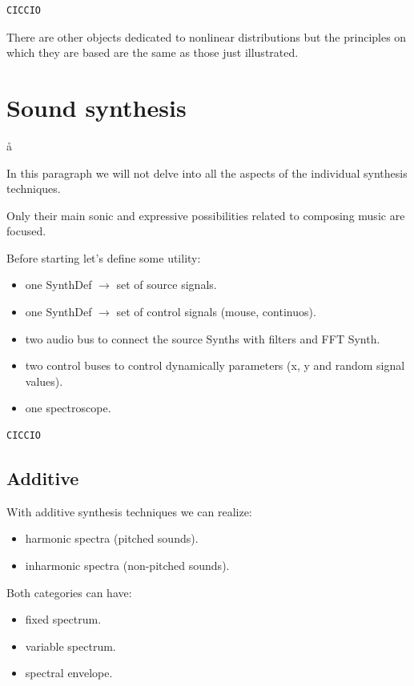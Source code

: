 \begin{lstlisting}[frame=single] 
CICCIO
\end{lstlisting}

There are other objects dedicated to nonlinear distributions but the principles on which they are based are the same as those just illustrated.

\section{Sound synthesis}\label{sound-synthesis}å

In this paragraph we will not delve into all the aspects of the individual synthesis techniques.

Only their main sonic and expressive possibilities related to composing music are focused.

Before starting let's define some utility:

\begin{itemize}
\tightlist
\item one SynthDef \(\rightarrow\) set of source signals. 
\item one SynthDef \(\rightarrow\) set of control signals (mouse, continuos). 
\item two audio bus to connect the source Synths with filters and FFT Synth. 
\item two control buses to control dynamically parameters (x, y and random signal values). 
\item one spectroscope.
\end{itemize}

\begin{lstlisting}[frame=single] 
CICCIO
\end{lstlisting}

\subsection{Additive}\label{additive}

With additive synthesis techniques we can realize: 

\begin{itemize}
\tightlist
\item harmonic spectra (pitched sounds). 
\item inharmonic spectra (non-pitched sounds).
\end{itemize}

Both categories can have:

\begin{itemize}
\tightlist
\item fixed spectrum.
\item variable spectrum.
\item spectral envelope.
\end{itemize}

